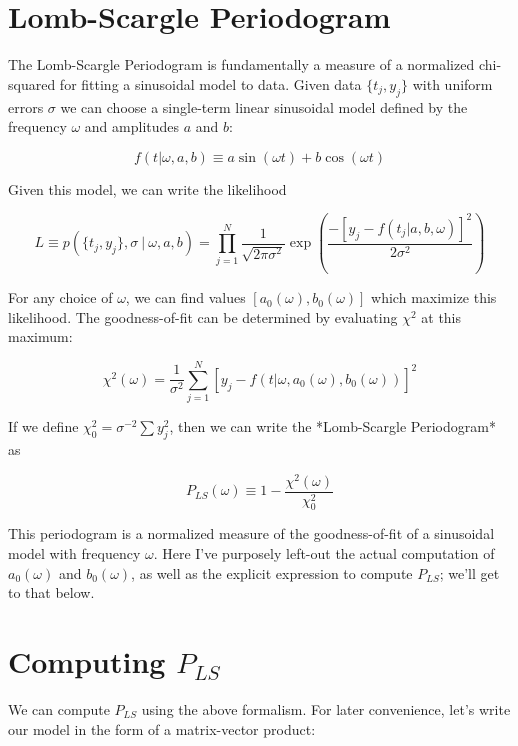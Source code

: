 \documentclass[12pt,pdftex]{article}
\begin{document}
\section{Lomb-Scargle Periodogram}
The Lomb-Scargle Periodogram is fundamentally a measure of a normalized chi-squared for fitting a sinusoidal model to data. Given data $\{t_j, y_j\}$ with uniform errors $\sigma$ we can choose a single-term linear sinusoidal model defined by the frequency $\omega$ and amplitudes $a$ and $b$:

\begin{equation}
  f(t|\omega, a, b) \equiv a\sin(\omega t) + b\cos(\omega t)
\end{equation}

Given this model, we can write the likelihood

\begin{equation}
  L \equiv p(\{t_j, y_j\}, \sigma~|~\omega, a, b) =
  \prod_{j=1}^{N} \frac{1}{\sqrt{2\pi\sigma^2}} \exp\left(
  \frac{-[y_j - f(t_j|a, b, \omega)]^2}{2\sigma^2}
  \right)
\end{equation}

For any choice of $\omega$, we can find values $[a_0(\omega), b_0(\omega)]$ which maximize this likelihood. The goodness-of-fit can be determined by evaluating $\chi^2$ at this maximum:

\begin{equation}
  \chi^2(\omega) = \frac{1}{\sigma^2}\sum_{j=1}^N[y_j - f(t|\omega, a_0(\omega), b_0(\omega))]^2
\end{equation}

If we define $\chi_0^2 = \sigma^{-2}\sum y_j^2$, then we can write the *Lomb-Scargle Periodogram* as

\begin{equation}
  P_{LS}(\omega) \equiv 1 - \frac{\chi^2(\omega)}{\chi_0^2}
\end{equation}

This periodogram is a normalized measure of the goodness-of-fit of a sinusoidal model with frequency $\omega$. Here I've purposely left-out the actual computation of $a_0(\omega)$ and $b_0(\omega)$, as well as the explicit expression to compute $P_{LS}$; we'll get to that below.

\section{Computing $P_{LS}$}
We can compute $P_{LS}$ using the above formalism.
For later convenience, let's write our model in the form of a matrix-vector product:
\end{document}
